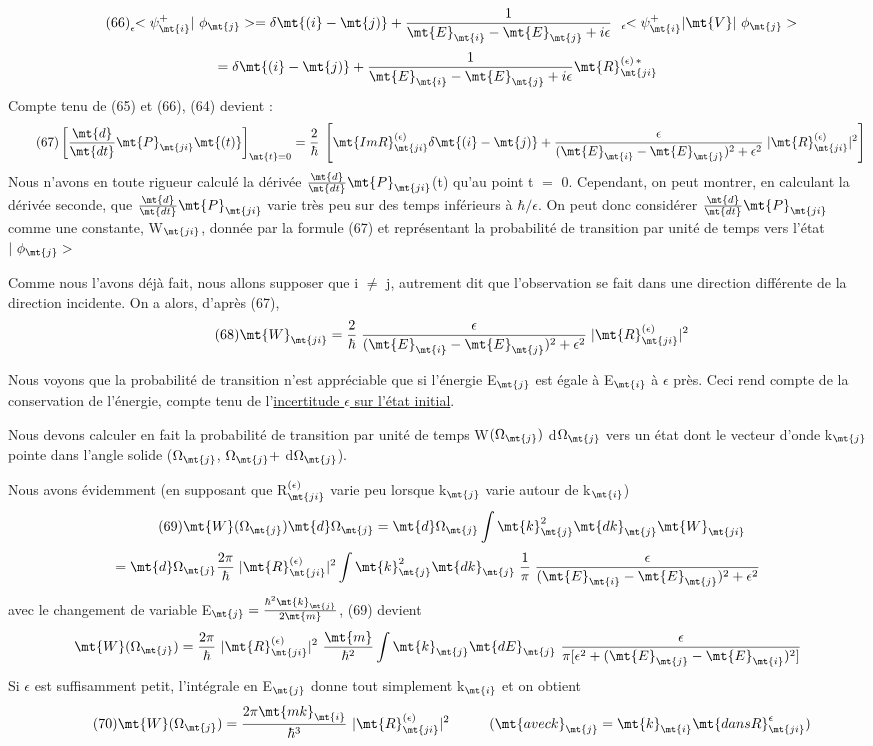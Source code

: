 \[
\tag{66}_\epsilon\!\!<\psi^+_\mt{i }|\ \phi_\mt{j}>=\delta\mt{(i}-\mt{j)}+
\frac{1}{\mt{E}_\mt{i}-\mt{E}_\mt{j}+i\epsilon}{\ \ }_\epsilon\!\!<\psi^+_\mt{i }|\mt{ V }|\ \phi_\mt{j}>
\]
\[
=\delta\mt{(i}-\mt{j)}+
\frac{1}{\mt{E}_\mt{i}-\mt{E}_\mt{j}+i\epsilon}\mt{ R}_\mt{ji}^{(\epsilon)\,*}
\]
Compte tenu de (65) et (66), (64) devient :
\[
\tag{67}\left[\frac{\mt{d}}{\mt{dt}}\mt{P}_\mt{ji}\mt{(t)}\right]_{\mt{t}=0}=\frac{2}{\hbar}\;\left[
\mt{Im R}_\mt{ji}^{(\epsilon)}\delta\mt{(i}-\mt{j)}+\frac{\epsilon}{(\mt{E}_\mt{i}-\mt{E}_\mt{j})^2+\epsilon^2}\;
|\mt{R}_\mt{ji}^{(\epsilon)}|^2\right]
\]
Nous n'avons en toute rigueur calculé la dérivée $\frac{\mt{d}}{\mt{dt}}\mt{P}_\mt{ji}$(t) qu'au point
t $=$ 0. Cependant, on peut montrer, en calculant la dérivée seconde, que
$\frac{\mt{d}}{\mt{dt}}\mt{P}_\mt{ji}$
varie très peu sur des temps inférieurs à $\hbar/\epsilon$. On peut donc considérer
$\frac{\mt{d}}{\mt{dt}}\mt{P}_\mt{ji}$
comme une constante, W$_\mt{ji}$, donnée par la formule (67)
et représentant la probabilité de transition par unité de temps vers
l'état $|\ \phi_\mt{j}>$

Comme nous l'avons déjà fait, nous allons supposer que i $\neq$ j,
autrement dit que l'observation se fait dans une direction différente de
la direction incidente. On a alors, d'après (67),
\[
\tag{68}\mt{W}_\mt{ji}=
\frac{2}{\hbar}\;\frac{\epsilon}{(\mt{E}_\mt{i}-\mt{E}_\mt{j})^2+\epsilon^2}\;
|\mt{R}_\mt{ji}^{(\epsilon)}|^2
\]

Nous voyons que la probabilité de transition n'est appréciable
que si l'énergie E$_\mt{j}$ est égale à E$_\mt{i}$ à $\epsilon$ près. Ceci rend compte de la conservation
de l'énergie, compte tenu de l'\ul{incertitude $\epsilon$ sur l'état initial}.

Nous devons calculer en fait la probabilité de transition par
unité de temps W$(\Omega_\mt{j})$ d$\Omega_\mt{j}$ vers un état dont le vecteur d'onde k$_\mt{j}$ pointe
dans l'angle solide ($\Omega_\mt{j}$, $\Omega_\mt{j }+$ d$\Omega_\mt{j}$).

Nous avons évidemment (en supposant que R$_\mt{ji}^{(\epsilon)}$ varie peu lorsque
k$_\mt{j}$ varie autour de k$_\mt{i}$)
\[
\tag{69}\mt{W}(\Omega_\mt{j})\mt{ d}\Omega_\mt{j }=
\mt{ d}\Omega_\mt{j}\int\mt{k}_\mt{j}^2\mt{ dk}_\mt{j}\mt{ W}_\mt{ji}
\]
\[
=\mt{ d}\Omega_\mt{j }\frac{2\pi}{\hbar}\;|\mt{R}_\mt{ji}^{(\epsilon)}|^2\int\mt{k}_\mt{j}^2
\mt{ dk}_\mt{j}\;\frac{1}{\pi}\;\frac{\epsilon}{(\mt{E}_\mt{i}-\mt{E}_\mt{j})^2+\epsilon^2}
\]
avec le changement de variable E$_\mt{j}=\frac{\hbar^2\mt{k}_\mt{j}}{2\mt{m}}$,
(69) devient
\[
\mt{W}(\Omega_\mt{j})=\frac{2\pi}{\hbar}\ |\mt{R}_\mt{ji}^{(\epsilon)}|^2\ \frac{\mt{m}}{\hbar^2}
\int\mt{k}_\mt{j}
\mt{ dE}_\mt{j}\ \frac{\epsilon}{\pi[\epsilon^2+(\mt{E}_\mt{j}-\mt{E}_\mt{i})^2]}
\]
Si $\epsilon$ est suffisamment petit, l'intégrale en E$_\mt{j}$ donne tout simplement k$_\mt{i}$
et on obtient
\[
\tag{70}\mt{W}(\Omega_\mt{j})=\frac{2\pi\mt{ m k}_\mt{i}}{\hbar^3}\ |\mt{R}_\mt{ji}^{(\epsilon)}|^2
\hspace{1cm} (\mt{avec k}_\mt{j}=\mt{k}_\mt{i}\mt{ dans R}_\mt{ji}^\epsilon)
\]
